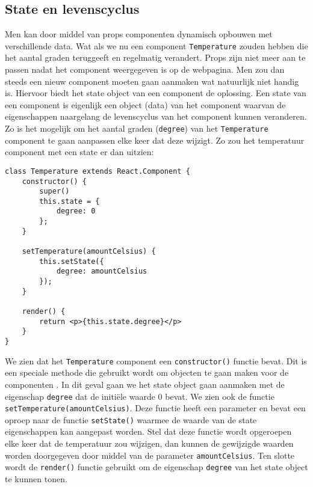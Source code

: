 \subsection{State en levenscyclus}
\label{subsec:state-en-levenscyclus}
Men kan door middel van props componenten dynamisch opbouwen met verschillende data. Wat als we nu een component \lstinline[basicstyle=\ttfamily\color{red}]|Temperature| zouden hebben die het aantal graden teruggeeft en regelmatig verandert. Props zijn niet meer aan te passen nadat het component weergegeven is op de webpagina. Men zou dan steeds een nieuw component moeten gaan aanmaken wat natuurlijk niet handig is. Hiervoor biedt het state object van een component de oplossing. Een state van een component is eigenlijk een object (data) van het component waarvan de eigenschappen naargelang de levenscyclus van het component kunnen veranderen. Zo is het mogelijk om het aantal graden (\lstinline[basicstyle=\ttfamily\color{red}]|degree|) van het \lstinline[basicstyle=\ttfamily\color{red}]|Temperature| component te gaan aanpassen elke keer dat deze wijzigt. Zo zou het temperatuur component met een state er dan uitzien:

\begin{lstlisting}[frame=single, caption=Het temperature component met de bijhorende state.]
class Temperature extends React.Component {
	constructor() {
		super()
		this.state = {
			degree: 0
		};
	}
	
	setTemperature(amountCelsius) {
		this.setState({
			degree: amountCelsius
		});
	}

	render() {
		return <p>{this.state.degree}</p>
	}
}
\end{lstlisting}

We zien dat het \lstinline[basicstyle=\ttfamily\color{red}]|Temperature| component een \lstinline[basicstyle=\ttfamily\color{red}]|constructor()| functie bevat. Dit is een speciale methode die gebruikt wordt om objecten te gaan maken voor de componenten \autocite{Chima2017}. In dit geval gaan we het state object gaan aanmaken met de eigenschap \lstinline[basicstyle=\ttfamily\color{red}]|degree| dat de initiële waarde 0 bevat. We zien ook de functie \lstinline[basicstyle=\ttfamily\color{red}]|setTemperature(amountCelsius)|. Deze functie heeft een parameter en bevat een oproep naar de functie \lstinline[basicstyle=\ttfamily\color{red}]|setState()| waarmee de waarde van de state eigenschappen kan aangepast worden. Stel dat deze functie wordt opgeroepen elke keer dat de temperatuur zou wijzigen, dan kunnen de gewijzigde waarden worden doorgegeven door middel van de parameter \lstinline[basicstyle=\ttfamily\color{red}]|amountCelsius|. Ten slotte wordt de \lstinline[basicstyle=\ttfamily\color{red}]|render()| functie gebruikt om de eigenschap \lstinline[basicstyle=\ttfamily\color{red}]|degree|
van het state object te kunnen tonen.

